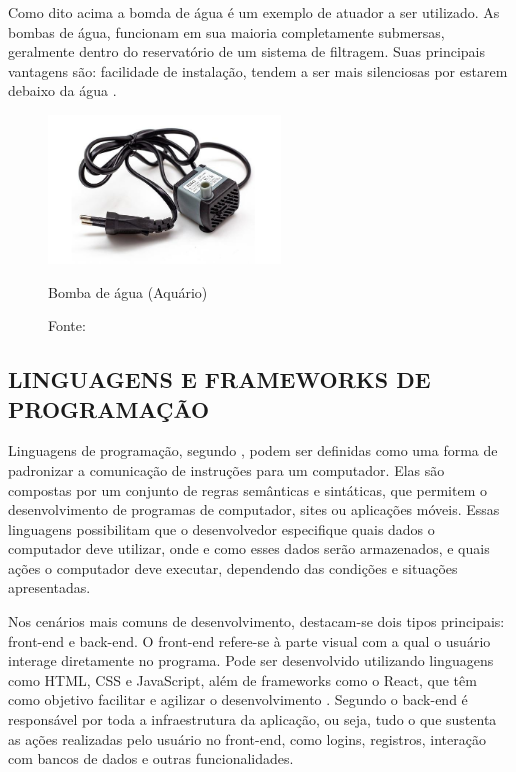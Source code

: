             Como dito acima a bomda de água é um exemplo de atuador a ser utilizado. As bombas de água, funcionam em sua maioria completamente submersas, geralmente dentro do reservatório de um sistema de filtragem. Suas principais vantagens são: facilidade de instalação, tendem a ser mais silenciosas por estarem debaixo da água \cite{lucifabio2023aquario}.

            \begin{figure}[H]
                \centering
                \caption{ }  
                \centering
                \label{fig:cont}
                \includegraphics[width=0.55\textwidth]{imagens/bombaAgua.png}
                \caption*{Bomba de água (Aquário)}
                \caption*{Fonte: \cite{lucifabio2023aquario}}
            \end{figure}


    
    \subsection{LINGUAGENS E FRAMEWORKS DE PROGRAMAÇÃO}
        Linguagens de programação, segundo \cite{linguagemProgramacao}, podem ser definidas como uma forma de padronizar a comunicação de instruções para um computador. Elas são compostas por um conjunto de regras semânticas e sintáticas, que permitem o desenvolvimento de programas de computador, sites ou aplicações móveis. Essas linguagens possibilitam que o desenvolvedor especifique quais dados o computador deve utilizar, onde e como esses dados serão armazenados, e quais ações o computador deve executar, dependendo das condições e situações apresentadas.

        Nos cenários mais comuns de desenvolvimento, destacam-se dois tipos principais: front-end e back-end. O front-end refere-se à parte visual com a qual o usuário interage diretamente no programa. Pode ser desenvolvido utilizando linguagens como HTML, CSS e JavaScript, além de frameworks como o React, que têm como objetivo facilitar e agilizar o desenvolvimento \cite{dadesenvolvimento}. Segundo \cite{calcca2022analise} o back-end é responsável por toda a infraestrutura da aplicação, ou seja, tudo o que sustenta as ações realizadas pelo usuário no front-end, como logins, registros, interação com bancos de dados e outras funcionalidades.
        
